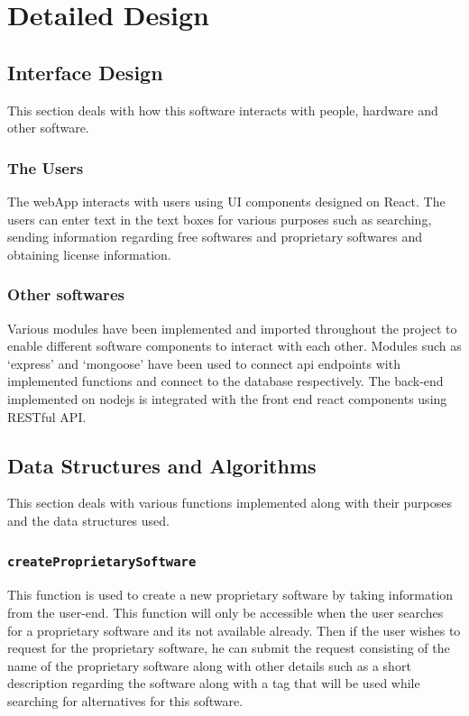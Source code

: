 \chapter{Detailed Design}

\section{Interface Design}

This section deals with how this software interacts with people, hardware and other software.

\subsection{The Users}
The webApp interacts with users using UI components designed on React. The users can enter text in the text boxes for various purposes such as searching, sending information regarding free softwares and proprietary softwares and obtaining license information.

\subsection{Other softwares}
Various modules have been implemented and imported throughout the project to enable different software components to interact with each other. Modules such as ‘express’ and ‘mongoose’ have been used to connect api endpoints with implemented functions and connect to the database respectively. The back-end implemented on nodejs is integrated with the front end react components using RESTful API.

\section{Data Structures and Algorithms}
This section deals with various functions implemented along with their purposes and the data structures used.

\subsection{\texttt{createProprietarySoftware}}
This function is used to create a new proprietary software by taking information from the user-end. This function will only be accessible when the user searches for a proprietary software and its not available already. Then if the user wishes to request for the proprietary software, he can submit the request consisting of the name of the proprietary software along with other details such as a short description regarding the software along with a tag that will be used while searching for  alternatives for this software.


